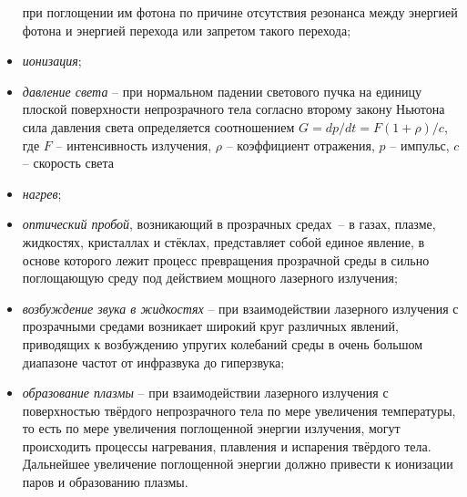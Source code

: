 \begin{itemize}
        при поглощении им фотона по причине отсутствия резонанса между
        энергией фотона и энергией перехода или запретом такого перехода;
    \item \emph{ионизация};
    \item \emph{давление света} --
        при нормальном падении светового пучка на единицу плоской поверхности
        непрозрачного тела согласно второму закону Ньютона сила давления
        света определяется соотношением \( G = dp/dt = F(1+\rho)/c \), где
        \( F \) -- интенсивность излучения, \( \rho \) -- коэффициент
        отражения, \( p \) -- импульс, \( c \) -- скорость света
    \item \emph{нагрев};
    \item \emph{оптический пробой}, возникающий в прозрачных средах~-- в газах,
        плазме, жидкостях, кристаллах и стёклах, представляет собой единое
        явление, в основе которого лежит процесс превращения прозрачной среды в
        сильно поглощающую среду под действием мощного лазерного излучения;
    \item \emph{возбуждение звука в жидкостях} --
        при взаимодействии лазерного излучения с прозрачными средами возникает
        широкий круг различных явлений, приводящих к возбуждению упругих
        колебаний среды в очень большом диапазоне частот от инфразвука до
        гиперзвука;
    \item \emph{образование плазмы} --
        при взаимодействии лазерного излучения с поверхностью твёрдого
        непрозрачного тела по мере увеличения температуры, то есть по мере
        увеличения поглощенной энергии излучения, могут происходить процессы
        нагревания, плавления и испарения твёрдого тела. Дальнейшее увеличение
        поглощенной энергии должно привести к ионизации паров и образованию
        плазмы.
\end{itemize}

